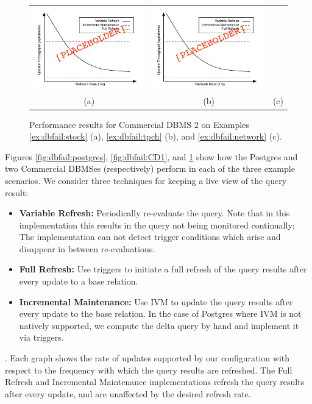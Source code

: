 \begin{figure}
\begin{center}
\begin{tabular}{ccc}
\includegraphics[width=2in]{../graphics-tmp/placeholder_db_result} &
\includegraphics[width=2in]{../graphics-tmp/placeholder_db_result} \\
(a) & (b) & (c)
\end{tabular}
\end{center}
\label{fig:dbfail:CD2}
\caption{Performance results for Commercial DBMS 2 on Examples \ref{ex:dbfail:stock} (a), \ref{ex:dbfail:tpch} (b), and \ref{ex:dbfail:network} (c).}
\end{figure}

Figures \ref{fig:dbfail:postgres}, \ref{fig:dbfail:CD1}, and \ref{fig:dbfail:CD2} show how the Postgres and two Commercial DBMSes (respectively) perform in each of the three example scenarios.  We consider three techniques for keeping a live view of the query result:
\begin{itemize}
\item {\bf Variable Refresh:} Periodically re-evaluate the query.  Note that in this implementation this results in the query not being monitored continually; The implementation can not detect trigger conditions which arise and disappear in between re-evaluations.
\item {\bf Full Refresh:} Use triggers to initiate a full refresh of the query results after every update to a base relation.  
\item {\bf Incremental Maintenance:} Use IVM to update the query results after every update to the base relation.  In the case of Postgres where IVM is not natively supported, we compute the delta query by hand and implement it via triggers.
\end{itemize}

.  Each graph shows the rate of updates supported by our configuration with respect to the frequency with which the query results are refreshed.  The Full Refresh and Incremental Maintenance implementations refresh the query results after every update, and are unaffected by the desired refresh rate.

